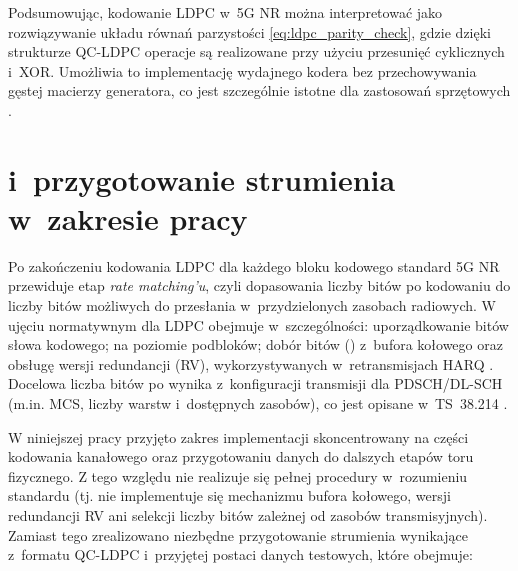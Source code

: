 Podsumowując, kodowanie LDPC w~5G NR można interpretować jako rozwiązywanie układu równań parzystości \eqref{eq:ldpc_parity_check},
gdzie dzięki strukturze QC-LDPC operacje są realizowane przy użyciu przesunięć cyklicznych i~XOR. Umożliwia to implementację
wydajnego kodera bez przechowywania gęstej macierzy generatora, co jest szczególnie istotne dla zastosowań sprzętowych \cite{bib:nguyen2019_qcldpc}.

\section{ i~przygotowanie strumienia w~zakresie pracy}
\label{sec:analiza_ratematching}

Po zakończeniu kodowania LDPC dla każdego bloku kodowego standard 5G NR przewiduje etap \emph{rate matching'u},
czyli dopasowania liczby bitów po kodowaniu do liczby bitów możliwych do przesłania w~przydzielonych zasobach radiowych.
W ujęciu normatywnym  dla LDPC obejmuje w~szczególności: uporządkowanie bitów słowa kodowego;
 na poziomie podbloków; dobór bitów () z~bufora kołowego oraz obsługę wersji redundancji (RV),
wykorzystywanych w~retransmisjach HARQ \cite{bib:3gpp_38212}. Docelowa liczba bitów po  wynika z~konfiguracji transmisji
dla PDSCH/DL-SCH (m.in. MCS, liczby warstw i~dostępnych zasobów), co jest opisane w~TS~38.214 \cite{bib:3gpp_38214}.

W niniejszej pracy przyjęto zakres implementacji skoncentrowany na części kodowania kanałowego oraz przygotowaniu danych
do dalszych etapów toru fizycznego. Z tego względu nie realizuje się pełnej procedury  w~rozumieniu standardu
(tj. nie implementuje się mechanizmu bufora kołowego, wersji redundancji RV ani selekcji liczby bitów zależnej od zasobów transmisyjnych).
Zamiast tego zrealizowano niezbędne przygotowanie strumienia wynikające z~formatu QC-LDPC i~przyjętej postaci danych testowych,
które obejmuje:

